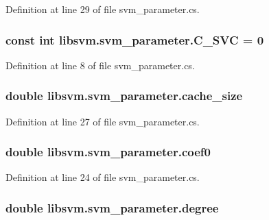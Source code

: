 Definition at line 29 of file svm\_\-parameter.cs.

\hypertarget{classlibsvm_1_1svm__parameter_af3a981d772ced251e35571cd10c3ab16}{
\subsubsection[{C\_\-SVC}]{\setlength{\rightskip}{0pt plus 5cm}const int {\bf libsvm.svm\_\-parameter.C\_\-SVC} = 0}}
\label{classlibsvm_1_1svm__parameter_af3a981d772ced251e35571cd10c3ab16}


Definition at line 8 of file svm\_\-parameter.cs.

\hypertarget{classlibsvm_1_1svm__parameter_a0a8d8323860d2390dd7833ee49efe541}{
\subsubsection[{cache\_\-size}]{\setlength{\rightskip}{0pt plus 5cm}double {\bf libsvm.svm\_\-parameter.cache\_\-size}}}
\label{classlibsvm_1_1svm__parameter_a0a8d8323860d2390dd7833ee49efe541}


Definition at line 27 of file svm\_\-parameter.cs.

\hypertarget{classlibsvm_1_1svm__parameter_aaae3b57325334aaa0b7cd678fc2d14a9}{
\subsubsection[{coef0}]{\setlength{\rightskip}{0pt plus 5cm}double {\bf libsvm.svm\_\-parameter.coef0}}}
\label{classlibsvm_1_1svm__parameter_aaae3b57325334aaa0b7cd678fc2d14a9}


Definition at line 24 of file svm\_\-parameter.cs.

\hypertarget{classlibsvm_1_1svm__parameter_a0409f4308411db81d44e2b3b007d494e}{
\subsubsection[{degree}]{\setlength{\rightskip}{0pt plus 5cm}double {\bf libsvm.svm\_\-parameter.degree}}}
\label{classlibsvm_1_1svm__parameter_a0409f4308411db81d44e2b3b007d494e}


